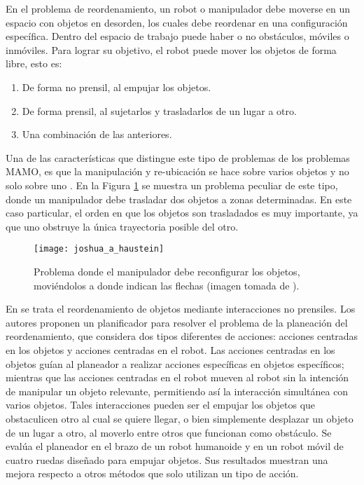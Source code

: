 En el problema de reordenamiento, un robot o manipulador debe moverse en un espacio con objetos en desorden, los cuales debe reordenar en una configuración específica.
Dentro del espacio de trabajo puede haber o no obstáculos, móviles o inmóviles.
Para lograr su objetivo, el robot puede mover los objetos de forma libre, esto es:
%
\begin{enumerate}[label=\alph*)]
	\item De forma no prensil, al empujar los objetos.
	\item De forma prensil, al sujetarlos y trasladarlos de un lugar a otro.
	\item Una combinación de las anteriores.
\end{enumerate}
%
Una de las características que distingue este tipo de problemas de los problemas MAMO, es que la manipulación y re-ubicación se hace sobre varios objetos y no solo sobre uno \cite{2019arXiv190103557H}.
En la Figura \ref{fig:2019arXiv190103557H} se muestra un problema peculiar de este tipo, donde un manipulador debe trasladar dos objetos a zonas determinadas. 
En este caso particular, el orden en que los objetos son trasladados es muy importante, ya que uno obstruye la única trayectoria posible del otro.
%
\begin{figure}[H]
	\texttt{[image: joshua\_a\_haustein]}%
	\caption{Problema donde el manipulador debe reconfigurar los objetos, moviéndolos a donde indican las flechas (imagen tomada de \cite{2019arXiv190103557H}).}%
	\label{fig:2019arXiv190103557H}%
\end{figure}
%
En \cite{7487583} se trata el reordenamiento de objetos mediante interacciones no prensiles. 
Los autores proponen un planificador para resolver el problema de la planeación del reordenamiento, que considera dos tipos diferentes de acciones: acciones centradas en los objetos y acciones centradas en el robot.
Las acciones centradas en los objetos guían al planeador a realizar acciones específicas en objetos específicos; mientras que las acciones centradas en el robot mueven al robot sin la intención de manipular un objeto relevante, permitiendo así la interacción simultánea con varios objetos.
Tales interacciones pueden ser el empujar los objetos que obstaculicen otro al cual se quiere llegar, o bien simplemente desplazar un objeto de un lugar a otro, al moverlo entre otros que funcionan como obstáculo.
Se evalúa el planeador en el brazo de un robot humanoide y en un robot móvil de cuatro ruedas diseñado para empujar objetos.
Sus resultados muestran una mejora respecto a otros métodos que solo utilizan un tipo de acción.

